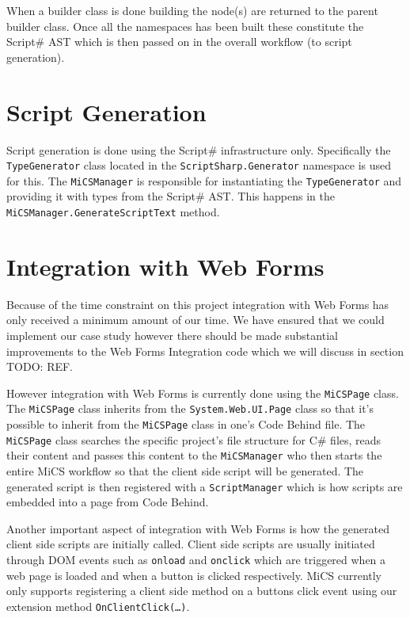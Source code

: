 	When a builder class is done building the node(s) are returned to the parent builder class. Once all the namespaces has been built these constitute the Script\# AST which is then passed on in the overall workflow (to script generation).

\section{Script Generation} %
\label{sec:script_generation}
	Script generation is done using the Script\# infrastructure only. Specifically the \texttt{TypeGenerator} class located in the \texttt{ScriptSharp.Generator} namespace is used for this. The \texttt{MiCSManager} is responsible for instantiating the \texttt{TypeGenerator} and providing it with types from the Script\# AST. This happens in the \texttt{MiCSManager.GenerateScriptText} method.

\section{Integration with Web Forms} %
\label{sec:integration_with_web_forms}
	Because of the time constraint on this project integration with Web Forms has only received a minimum amount of our time. We have ensured that we could implement our case study however there should be made substantial improvements to the Web Forms Integration code which we will discuss in section TODO: REF.

	However integration with Web Forms is currently done using the \texttt{MiCSPage} class. The \texttt{MiCSPage} class inherits from the \texttt{System.Web.UI.Page} class so that it’s possible to inherit from the \texttt{MiCSPage} class in one’s Code Behind file.  The \texttt{MiCSPage} class searches the specific project’s file structure for C\# files, reads their content and passes this content to the \texttt{MiCSManager} who then starts the entire MiCS workflow so that the client side script will be generated. The generated script is then registered with a \texttt{ScriptManager} which is how scripts are embedded into a page from Code Behind.

	Another important aspect of integration with Web Forms is how the generated client side scripts are initially called. Client side scripts are usually initiated through DOM events such as \texttt{onload} and \texttt{onclick} which are triggered when a web page is loaded and when a button is clicked respectively. MiCS currently only supports registering a client side method on a buttons click event using our extension method \texttt{OnClientClick(…)}.

